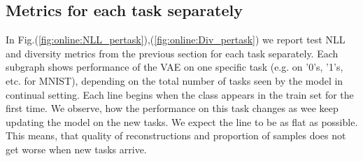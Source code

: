 \subsection{Metrics for each task separately} \label{app:pertask}
In Fig.(\ref{fig:online:NLL_pertask}),(\ref{fig:online:Div_pertask}) we report test NLL and diversity metrics from the previous section for each task separately. Each subgraph shows performance of the VAE on one specific task (e.g. on '0's, '1's, etc. for MNIST), depending on the total number of tasks seen by the model in continual setting. Each line begins when the class appears in the train set for the first time. We observe, how the performance on this task changes as wee keep updating the model on the new tasks. We expect the line to be as flat as possible. This means, that quality of reconstructions and proportion of samples does not get worse when new tasks arrive. 
